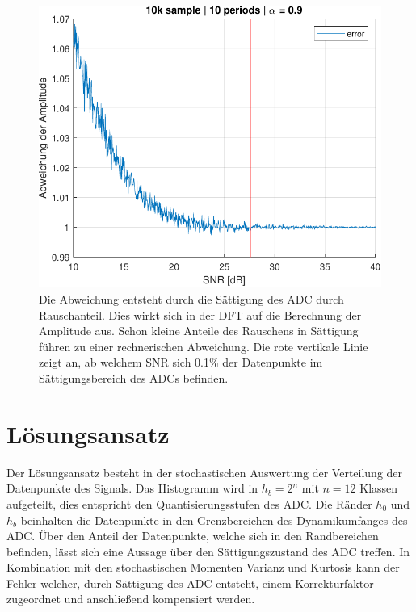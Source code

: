  \begin{figure}[h!] 
	\centering 
	\includegraphics[width=.8\columnwidth]{../img/noise-err.pdf}
	\caption{Die Abweichung entsteht durch die Sättigung des ADC durch Rauschanteil. Dies wirkt sich in der DFT auf die Berechnung der Amplitude aus. Schon kleine Anteile des Rauschens in Sättigung führen zu einer rechnerischen Abweichung. Die rote vertikale Linie zeigt an, ab welchem SNR sich 0.1\% der Datenpunkte im Sättigungsbereich des ADCs befinden.}
	\label{fig:Rauschanteil}
\end{figure}

\section{Lösungsansatz} 
 
Der Lösungsansatz besteht in der stochastischen Auswertung der Verteilung der Datenpunkte des Signals. Das Histogramm wird in $h_b = 2^n$ mit $n = 12$ Klassen aufgeteilt, dies entspricht den Quantisierungsstufen des ADC. Die Ränder $h_0$ und $h_b$ beinhalten die Datenpunkte in den Grenzbereichen des Dynamikumfanges des ADC. Über den Anteil der Datenpunkte, welche sich in den Randbereichen befinden, lässt sich eine Aussage über den Sättigungszustand des ADC treffen. In Kombination mit den stochastischen Momenten Varianz und Kurtosis kann der Fehler welcher, durch Sättigung des ADC entsteht, einem Korrekturfaktor zugeordnet und anschließend kompensiert werden. 


